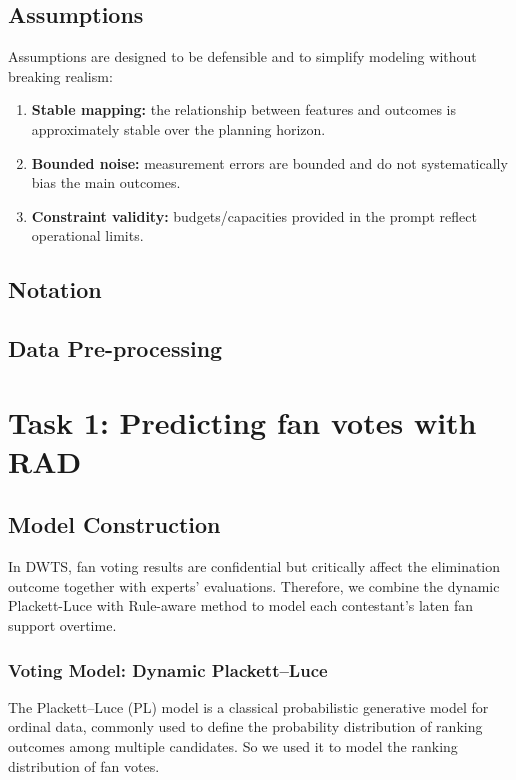 \documentclass[12pt]{article}
\begin{document}
\subsection{Assumptions}
Assumptions are designed to be defensible and to simplify modeling without breaking realism:
\begin{enumerate}[leftmargin=*]
  \item \textbf{Stable mapping:} the relationship between features and outcomes is approximately stable over the planning horizon.
  \item \textbf{Bounded noise:} measurement errors are bounded and do not systematically bias the main outcomes.
  \item \textbf{Constraint validity:} budgets/capacities provided in the prompt reflect operational limits.
\end{enumerate}

\subsection{Notation}

\subsection{Data Pre-processing}

\section{Task 1: Predicting fan votes with RAD}
\subsection{Model Construction}

In DWTS, fan voting results are confidential but critically affect the elimination outcome together with experts' evaluations. Therefore, we combine the dynamic Plackett-Luce with Rule-aware method to model each contestant's laten fan support overtime.

\subsubsection{Voting Model: Dynamic Plackett–Luce}

The Plackett–Luce (PL) model is a classical probabilistic generative model for ordinal data, commonly used to define the probability distribution of ranking outcomes among multiple candidates. So we used it to model the ranking distribution of fan votes.
\end{document}
